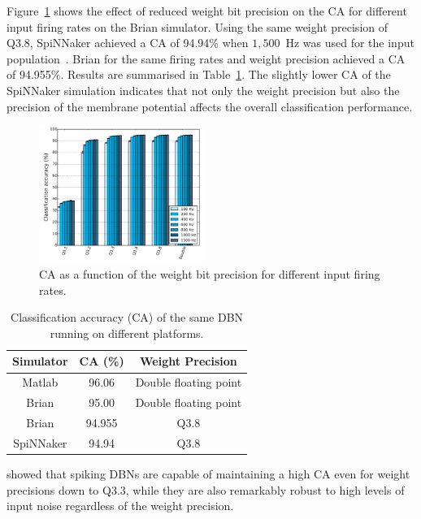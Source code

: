 \documentclass{frontiersENG} %
\begin{document}
Figure~\ref{Fig:brianCAfiringrate} shows the effect of reduced weight bit precision on the CA for different input firing rates on the Brian simulator.
Using the same weight precision of Q3.8, SpiNNaker achieved a CA of 94.94\% when $1,500$~Hz was used for the input population~\citep{Stromatias2015scalable}. Brian for the same firing rates and weight precision achieved a CA of 94.955\%. Results are summarised in Table~\ref{tab:casimulators}.
The slightly lower CA of the SpiNNaker simulation indicates that not only the weight precision but also the precision of the membrane potential affects the overall classification performance.    

\begin{figure}[hbt!]
	\centering
	\includegraphics[width=0.48\textwidth]{fig9}
	\caption{CA as a function of the weight bit precision for different input firing rates.}
	\label{Fig:brianCAfiringrate}
\end{figure} 


\begin{table}[h]
	\caption{Classification accuracy (CA) of the same DBN running on different platforms.}
	\begin{center}
		\begin{tabular} {c|c|c}
			Simulator & CA (\%) & Weight Precision \\
			\hline
			Matlab & 96.06 & Double floating point\\
			Brian & 95.00 & Double floating point\\
			Brian & 94.955 & Q3.8\\
			SpiNNaker & 94.94 & Q3.8\\
		\end{tabular}
		\label{tab:casimulators}
	\end{center}
\end{table}

\citet{stromatias2015robustness} showed that spiking DBNs are capable of maintaining a high CA even for weight precisions down to Q3.3, while they are also remarkably robust to high levels of input noise regardless of the weight precision. 
\end{document}
